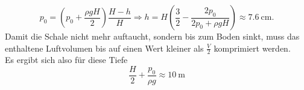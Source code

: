 \begin{Answer}[ref = glas]
	\begin{equation}\boxed{
		p_0= \left(p_0 + \frac{\rho g H}{2}\right) \frac{H-h}{H} \Rightarrow h = H \left(\frac{3}{2} - \frac{2p_0}{2p_0 + \rho g H}\right) \approx 7.6~\mathrm{cm}.}
	\end{equation}
	Damit die Schale nicht mehr auftaucht, sondern bis zum Boden sinkt, muss das enthaltene Luftvolumen bis auf einen Wert kleiner als $\frac{V}{2}$ komprimiert werden. \\
	Es ergibt sich also für diese Tiefe
	\begin{equation*}
	\boxed{
		\frac{H}{2}+ \frac{p_0}{\rho g} \approx 10~\mathrm{m}
		}
	\end{equation*}
\end{Answer}